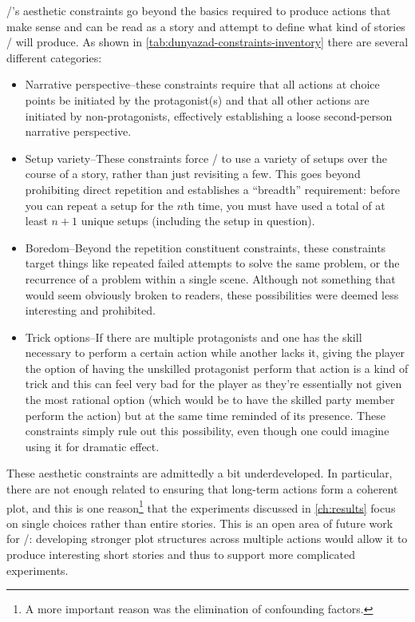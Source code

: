 \dunyazad/'s aesthetic constraints go beyond the basics required to produce actions that make sense and can be read as a story and attempt to define what kind of stories \dunyazad/ will produce.
%
As shown in \cref{tab:dunyazad-constraints-inventory} there are several different categories:
%
\begin{itemize}
  \item Narrative perspective--these constraints require that all actions at choice points be initiated by the protagonist(s) and that all other actions are initiated by non-protagonists, effectively establishing a loose second-person narrative perspective.
  \item Setup variety--These constraints force \dunyazad/ to use a variety of setups over the course of a story, rather than just revisiting a few. This goes beyond prohibiting direct repetition and establishes a ``breadth'' requirement: before you can repeat a setup for the $n$th time, you must have used a total of at least $n+1$ unique setups (including the setup in question).
  \item Boredom--Beyond the repetition constituent constraints, these constraints target things like repeated failed attempts to solve the same problem, or the recurrence of a problem within a single scene. Although not something that would seem obviously broken to readers, these possibilities were deemed less interesting and prohibited.
  \item Trick options--If there are multiple protagonists and one has the skill necessary to perform a certain action while another lacks it, giving the player the option of having the unskilled protagonist perform that action is a kind of trick and this can feel very bad for the player as they're essentially not given the most rational option (which would be to have the skilled party member perform the action) but at the same time reminded of its presence. These constraints simply rule out this possibility, even though one could imagine using it for dramatic effect.
\end{itemize}


These aesthetic constraints are admittedly a bit underdeveloped.
%
In particular, there are not enough related to ensuring that long-term actions form a coherent plot, and this is one reason\footnote{A more important reason was the elimination of confounding factors.} that the experiments discussed in \cref{ch:results} focus on single choices rather than entire stories.
%
This is an open area of future work for \dunyazad/: developing stronger plot structures across multiple actions would allow it to produce interesting short stories and thus to support more complicated experiments.

